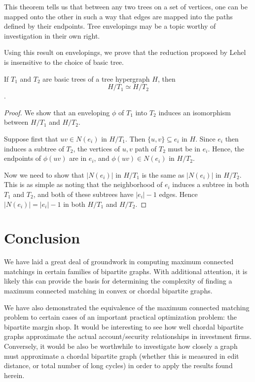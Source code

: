 This theorem tells us that between any two trees on a set of vertices, one can be mapped onto the other in such a way that edges are mapped into the paths defined by their endpoints.  Tree envelopings may be a topic worthy of investigation in their own right.

Using this result on envelopings, we prove that the reduction proposed by Lehel is insensitive to the choice of basic tree.
\begin{theorem}
	If $T_1$ and $T_2$ are basic trees of a tree hypergraph $H$, then \[H/T_1 \simeq H/T_2\].
\end{theorem}

\begin{proof}
	We show that an enveloping $\phi$ of $T_1$ into $T_2$ induces an isomorphism between $H/T_1$ and $H/T_2$.

Suppose first that $uv \in N(e_i)$ in $H/T_1$.  Then $\{u,v\}\subseteq e_i$ in $H$.  Since $e_i$ then induces a subtree of $T_2$, the vertices of $u,v$ path of $T_2$ must be in $e_i$.  Hence, the endpoints of $\phi(uv)$ are in $e_i$, and $\phi(uv) \in N(e_i)$ in $H/T_2$.

Now we need to show that $|N(e_i)|$ in $H/T_1$ is the same as  $|N(e_i)|$ in $H/T_2$.  This is as simple as noting that the neighborhood of $e_i$ induces a subtree in both $T_1$ and $T_2$, and both of these subtrees have $|e_i|-1$ edges.  Hence $|N(e_i)| = |e_i|-1$ in both $H/T_1$ and $H/T_2$.
\end{proof}

\section{Conclusion}

We have laid a great deal of groundwork in computing maximum connected matchings in certain families of bipartite graphs.  With additional attention, it is likely this can provide the basis for determining the complexity of finding a maximum connected matching in convex or chordal bipartite graphs.   

We have also demonstrated the equivalence of the maximum connected matching problem to certain cases of an important practical optimization problem: the bipartite margin shop.  It would be interesting to see how well chordal bipartite graphs approximate the actual account/security relationships in investment firms.  Conversely, it would be also be worthwhile to investigate how closely a graph must approximate a chordal bipartite graph (whether this is measured in edit distance, or total number of long cycles) in order to apply the results found herein.  

